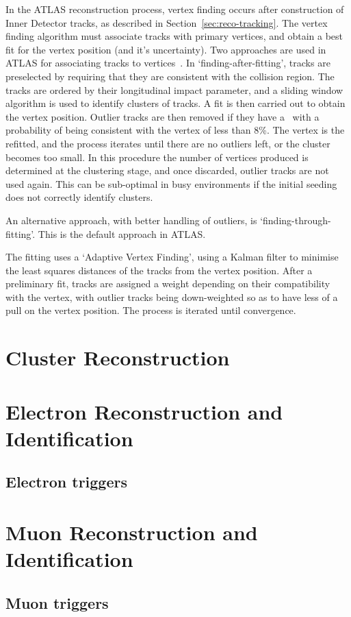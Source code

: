 In the ATLAS reconstruction process, vertex finding occurs after construction of
Inner Detector tracks, as described in Section~\ref{sec:reco-tracking}. The
vertex finding algorithm must associate tracks with primary vertices, and obtain
a best fit for the vertex position (and it's uncertainty). Two approaches are
used in ATLAS for associating tracks to vertices~\cite{1742-6596-119-3-032033}. 
In `finding-after-fitting',
tracks are preselected by requiring that they are consistent with the collision
region. The tracks are ordered by their longitudinal impact parameter, and a
sliding window algorithm is used to identify clusters of tracks. A fit is then
carried out to obtain the vertex position. Outlier tracks are then removed if
they have a \chisquared\ with a probability of being consistent with the vertex
of less than 8\%. The vertex is the refitted, and the process iterates until
there are no outliers left, or the cluster becomes too small. In this procedure
the number of vertices produced is determined at the clustering stage, and
once discarded, outlier tracks are not used again. This can be sub-optimal in
busy environments if the initial seeding does not correctly identify clusters.

An alternative approach, with better handling of outliers, is
`finding-through-fitting'. This is the default approach in ATLAS.

The fitting uses a
`Adaptive Vertex Finding', 
using a Kalman filter to minimise the least squares distances of the tracks from
the vertex position. After a preliminary fit, tracks are assigned a
weight depending on their compatibility with the vertex, with outlier tracks
being down-weighted so as to have less of a pull on the vertex position. The
process is iterated until convergence.



\section{Cluster Reconstruction}
\label{sec:reco-clustering}

\section{Electron Reconstruction and Identification}
\label{sec:reco-el}

\subsection{Electron triggers}
\label{sec:reco-el-triggers}

\section{Muon Reconstruction and Identification}
\label{sec:reco-mu}

\subsection{Muon triggers}
\label{sec:reco-mu-triggers}
